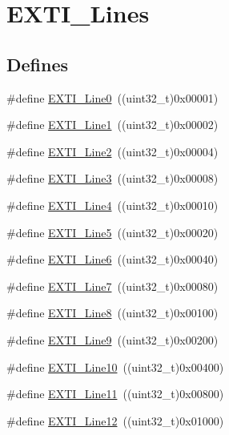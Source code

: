 \hypertarget{group__EXTI__Lines}{
\section{EXTI\_\-Lines}
\label{group__EXTI__Lines}
}
\subsection*{Defines}
\begin{DoxyCompactItemize}
\item 
\#define \hyperlink{group__EXTI__Lines_gac2a65680200dd5f4f7eab29cd4091a75}{EXTI\_\-Line0}~((uint32\_\-t)0x00001)
\item 
\#define \hyperlink{group__EXTI__Lines_gae7c6ab2a0880ce3810641ee0585104cd}{EXTI\_\-Line1}~((uint32\_\-t)0x00002)
\item 
\#define \hyperlink{group__EXTI__Lines_gaec4189bb2709c8c15a0339d1b0b9865a}{EXTI\_\-Line2}~((uint32\_\-t)0x00004)
\item 
\#define \hyperlink{group__EXTI__Lines_gadea3ef6ab7e8bacc686689de8711b98c}{EXTI\_\-Line3}~((uint32\_\-t)0x00008)
\item 
\#define \hyperlink{group__EXTI__Lines_gab33b1fe19306e9e60f8f8d0928b800be}{EXTI\_\-Line4}~((uint32\_\-t)0x00010)
\item 
\#define \hyperlink{group__EXTI__Lines_ga6b4c6292e3abd521cab2bf99d37a15c6}{EXTI\_\-Line5}~((uint32\_\-t)0x00020)
\item 
\#define \hyperlink{group__EXTI__Lines_ga97a5145d1d2612dd53bdd9db3d366873}{EXTI\_\-Line6}~((uint32\_\-t)0x00040)
\item 
\#define \hyperlink{group__EXTI__Lines_ga3b7155d54a4a98394b599718901ccbe5}{EXTI\_\-Line7}~((uint32\_\-t)0x00080)
\item 
\#define \hyperlink{group__EXTI__Lines_gacd51e087a088c3315049394cddf79e88}{EXTI\_\-Line8}~((uint32\_\-t)0x00100)
\item 
\#define \hyperlink{group__EXTI__Lines_ga340ca6bb77b7a2d7747c78e7d3370360}{EXTI\_\-Line9}~((uint32\_\-t)0x00200)
\item 
\#define \hyperlink{group__EXTI__Lines_gaefb90b266f5fc1571ed4606bbff1f1d7}{EXTI\_\-Line10}~((uint32\_\-t)0x00400)
\item 
\#define \hyperlink{group__EXTI__Lines_ga6157b34c53e9b5cb8ee0d7ac3f5ba292}{EXTI\_\-Line11}~((uint32\_\-t)0x00800)
\item 
\#define \hyperlink{group__EXTI__Lines_gab73a0a31f1814118955099b9dd3bdfef}{EXTI\_\-Line12}~((uint32\_\-t)0x01000)

\end{DoxyCompactItemize}
